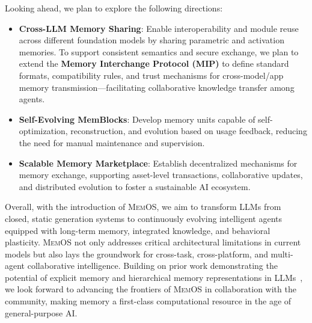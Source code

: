 \documentclass[]{memtensor}
\begin{document}
Looking ahead, we plan to explore the following directions:
\begin{itemize}
\item \textbf{Cross-LLM Memory Sharing}: Enable interoperability and module reuse across different foundation models by sharing parametric and activation memories. To support consistent semantics and secure exchange, we plan to extend the \textbf{Memory Interchange Protocol (MIP)} to define standard formats, compatibility rules, and trust mechanisms for cross-model/app memory transmission—facilitating collaborative knowledge transfer among agents.
\item \textbf{Self-Evolving MemBlocks}: Develop memory units capable of self-optimization, reconstruction, and evolution based on usage feedback, reducing the need for manual maintenance and supervision.
\item \textbf{Scalable Memory Marketplace}: Establish decentralized mechanisms for memory exchange, supporting asset-level transactions, collaborative updates, and distributed evolution to foster a sustainable AI ecosystem.
\end{itemize}

Overall, with the introduction of \textsc{MemOS}, we aim to transform LLMs from closed, static generation systems to continuously evolving intelligent agents equipped with long-term memory, integrated knowledge, and behavioral plasticity. \textsc{MemOS} not only addresses critical architectural limitations in current models but also lays the groundwork for cross-task, cross-platform, and multi-agent collaborative intelligence. Building on prior work demonstrating the potential of explicit memory and hierarchical memory representations in LLMs~\cite{memory3_Yang_2024}, we look forward to advancing the frontiers of \textsc{MemOS} in collaboration with the community, making memory a first-class computational resource in the age of general-purpose AI.



\end{document}
